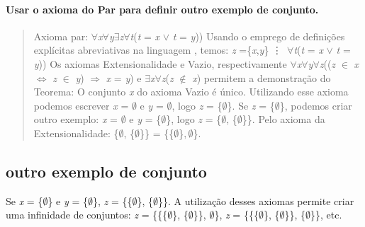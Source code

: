
\paragraph{Usar o axioma do Par para definir outro exemplo de conjunto.}
\begin{quote}
	Axioma par: $\forall$\textit{x}$\forall$\textit{y}$\exists$\textit{z}$\forall$\textit{t}(\textit{t} = \textit{x} $\lor$ \textit{t} = \textit{y}))
	\newline
	Usando o emprego de definições explícitas abreviativas na linguagem , temos:
	\newline
	\textit{z} =\{{\textit{x},\textit{y}}\}  \vdots \, $\forall$\textit{t}(\textit{t} = \textit{x} $\lor$ \textit{t} = \textit{y}))
	\newline
	Os axiomas Extensionalidade e Vazio, respectivamente $\forall$\textit{x}$\forall$\textit{y}$\forall$\textit{z}((\textit{z} $\in$ \textit{x} $\Leftrightarrow$ \textit{z} $\in$ \textit{y}) $\Rightarrow$  \textit{x} = \textit{y}) e $\exists$\textit{x}$\forall$\textit{z}(\textit{z} $\notin$ \textit{x}) permitem a demonstração do Teorema: O conjunto \textit{x} do axioma Vazio é único. Utilizando esse axioma podemos escrever \textit{x} = $\emptyset$ e \textit{y} = $\emptyset$, logo \textit{z} = \{$\emptyset$\}.
	\newline
	Se \textit{z} = \{$\emptyset$\}, podemos criar outro exemplo: \textit{x} = $\emptyset$ e \textit{y} = \{$\emptyset$\}, logo \textit{z} = \{$\emptyset$, \{$\emptyset$\}\}. Pelo axioma da Extensionalidade: \{$\emptyset$, \{$\emptyset$\}\} = \{\{$\emptyset$\}$, \emptyset$\}.

	
\end{quote}
\subsection{outro exemplo de conjunto}

Se  \textit{x} = \{$\emptyset$\} e \textit{y} = \{$\emptyset$\}, \textit{z} = \{\{$\emptyset$\}, \{$\emptyset$\}\}. A utilização desses axiomas permite criar uma infinidade de conjuntos: \textit{z} = \{\{\{$\emptyset$\}, \{$\emptyset$\}\}, $\emptyset$\}, \textit{z} = \{\{\{$\emptyset$\}, \{$\emptyset$\}\}, \{$\emptyset$\}\}, etc.

